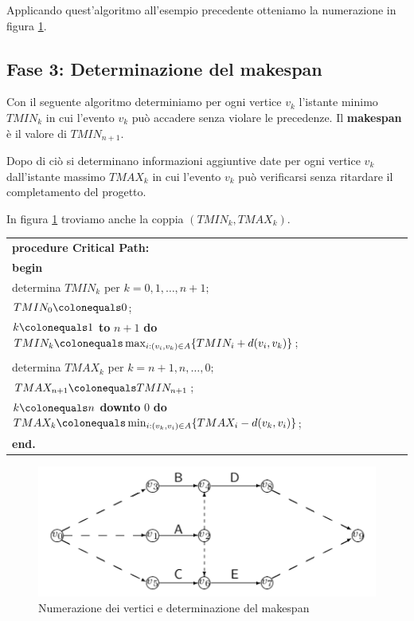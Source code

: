 \documentclass[11pt]{book}
\begin{document}
Applicando quest'algoritmo all'esempio precedente otteniamo la
numerazione in figura \ref{cap7fig714}.

\subsection{Fase 3: Determinazione del makespan}

Con il seguente algoritmo determiniamo per ogni vertice $v_k$
l'istante minimo $TMIN_k$ in cui l'evento $v_k$ pu\`o accadere senza
violare le precedenze. Il {\bf makespan} \`e il valore di
$TMIN_{n+1}$. 

Dopo di ci\`o si determinano informazioni aggiuntive date per ogni
vertice $v_k$ dall'istante massimo $TMAX_k$ in cui l'evento $v_k$
pu\`o verificarsi senza ritardare il completamento del progetto.

In figura \ref{cap7fig714} troviamo anche la coppia $(TMIN_k,TMAX_k)$.

\vspace{11pt}
\begin{center}
  \begin{tabular}{||l||}
    \hline\hline
    {\bf procedure Critical Path:}\\
    {\bf begin}\\
    \phantom{aa}{\bf comment:} determina $TMIN_k$ per $k = 0,1,\dots,n+1;$\\
    \phantom{aa}$TMIN_0 \colonequals 0$;\\
    \phantom{aa}{\bf for} $k \colonequals 1$ {\bf to} $n+1$ {\bf do} $TMIN_k \colonequals
    \max_{i:(v_i,v_k) \in A} \{ TMIN_i + d(v_i,v_k)\}$;\\ 
    \\
    \phantom{aa}{\bf comment:} determina $TMAX_k$ per $k = n+1,n,\dots,0;$\\
    \phantom{aa}$TMAX_{n+1} \colonequals TMIN_{n+1}$;\\
    \phantom{aa}{\bf for} $k \colonequals n$ {\bf downto} 0 {\bf do }$TMAX_k \colonequals
    \min_{i:(v_k,v_i) \in A} \{ TMAX_i - d(v_k,v_i)\}$;\\ 
    {\bf end.}\\
    \hline\hline
  \end{tabular}
\end{center}
\vspace{11pt}

\begin{figure}[h!]
  \centering
  \includegraphics[width=\textwidth]{images/cap7fig714.png}
  \caption{Numerazione dei vertici e determinazione del makespan}
  \label{cap7fig714}
\end{figure}
\end{document}
